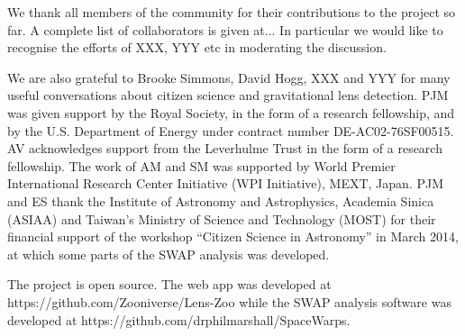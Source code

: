 We thank all \Ncollaboration members of the \sw community for their
contributions to the project so far. A complete list of collaborators is
given at... In particular we would like to recognise the efforts of XXX,
YYY etc in moderating the discussion.

We are also grateful to Brooke Simmons, David Hogg, XXX and YYY for many useful
conversations about citizen science and gravitational lens detection. 
%
PJM was given support by the Royal Society, in the form of a research
fellowship, and by the U.S. Department of Energy under contract number DE-AC02-76SF00515.
%
AV acknowledges support from the Leverhulme Trust in the form of a research
fellowship.
%
The work of AM and SM was supported by World Premier International Research
Center Initiative (WPI Initiative), MEXT, Japan.
%
% 
PJM and ES thank the Institute of Astronomy and Astrophysics, Academia Sinica
(ASIAA) and Taiwan's Ministry of Science and Technology (MOST) for their
financial support of the workshop ``Citizen Science in Astronomy'' in March
2014, at which some parts of the SWAP analysis was developed.


The \sw project is open source. 
The web app was developed at https://github.com/Zooniverse/Lens-Zoo
while the SWAP analysis software was developed at
https://github.com/drphilmarshall/SpaceWarps.

